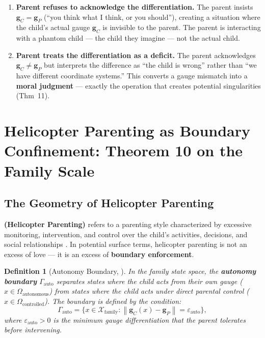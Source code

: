 \documentclass[11pt,a4paper]{article}
\newtheorem{definition}[theorem]{Definition}
\newcommand{\norm}[1]{\left\lVert#1\right\rVert}
\begin{document}
\begin{enumerate}[label=(\roman*)]
    \item \textbf{Parent refuses to acknowledge the differentiation.} The parent insists $\mathbf{g}_C = \mathbf{g}_P$ (``you think what I think, or you should''), creating a situation where the child's actual gauge $\mathbf{g}_C$ is invisible to the parent. The parent is interacting with a phantom child — the child they imagine — not the actual child.
    \item \textbf{Parent treats the differentiation as a deficit.} The parent acknowledges $\mathbf{g}_C \neq \mathbf{g}_P$ but interprets the difference as ``the child is wrong'' rather than ``we have different coordinate systems.'' This converts a gauge mismatch into a \textbf{moral judgment} — exactly the operation that creates potential singularities (Thm~11).
\end{enumerate}

\section{Helicopter Parenting as Boundary Confinement: Theorem 10 on the Family Scale}
\label{sec:helicopter}

\subsection{The Geometry of Helicopter Parenting}

\textbf{ (Helicopter Parenting)} refers to a parenting style characterized by excessive monitoring, intervention, and control over the child's activities, decisions, and social relationships \cite{padilla2014helicopter}. In potential surface terms, helicopter parenting is not an excess of love — it is an excess of \textbf{boundary enforcement}.

\begin{definition}[Autonomy Boundary, \textbf{}]
\label{def:autonomy_boundary}
In the family state space, the \textbf{autonomy boundary} $\Gamma_{\text{auto}}$ separates states where the child acts from their own gauge ($x \in \Omega_{\text{autonomous}}$) from states where the child acts under direct parental control ($x \in \Omega_{\text{controlled}}$). The boundary is defined by the condition:
\begin{equation}
    \Gamma_{\text{auto}} = \{x \in \mathcal{X}_{\text{family}} : \norm{\mathbf{g}_C(x) - \mathbf{g}_P} = \varepsilon_{\text{auto}}\},
\end{equation}
where $\varepsilon_{\text{auto}} > 0$ is the minimum gauge differentiation that the parent tolerates before intervening.
\end{definition}
\end{document}
